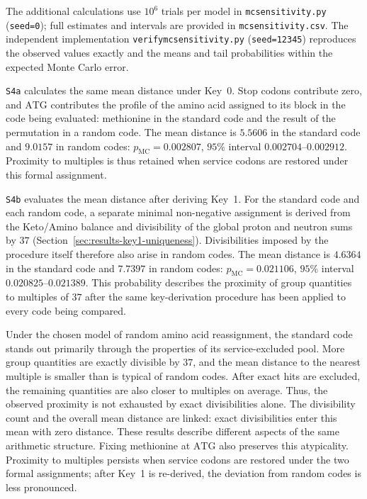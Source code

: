\documentclass[11pt,a4paper]{article}
\renewcommand{\_}{\origunderscore\allowbreak}
\begin{document}
The additional calculations use $10^{6}$ trials per model
in \texttt{mc\_sensitivity.py} (\texttt{seed=0}); full estimates
and intervals are provided in \texttt{mc\_sensitivity.csv}.
The independent implementation \texttt{verify\_mc\_sensitivity.py}
(\texttt{seed=12345}) reproduces the observed values exactly
and the means and tail probabilities within the expected
Monte Carlo error.

\texttt{S4a} calculates the same mean distance under Key~0.
Stop codons contribute zero, and $\mathrm{ATG}$ contributes
the profile of the amino acid assigned to its block in the
code being evaluated: methionine in the standard code and
the result of the permutation in a random code.
The mean distance is $5.5606$ in the standard code and $9.0157$
in random codes:
$p_{\mathrm{MC}} = 0.002807$,
$95\%$ interval $0.002704$--$0.002912$.
Proximity to multiples is thus retained when service codons
are restored under this formal assignment.

\texttt{S4b} evaluates the mean distance after deriving Key~1.
For the standard code and each random code, a separate minimal
non-negative assignment is derived from the Keto/Amino balance
and divisibility of the global proton and neutron sums by $37$
(Section~\ref{sec:results-key1-uniqueness}).
Divisibilities imposed by the procedure itself therefore also
arise in random codes. The mean distance is $4.6364$ in the
standard code and $7.7397$ in random codes:
$p_{\mathrm{MC}} = 0.021106$,
$95\%$ interval $0.020825$--$0.021389$.
This probability describes the proximity of group quantities
to multiples of $37$ after the same key-derivation procedure
has been applied to every code being compared.

Under the chosen model of random amino acid reassignment,
the standard code stands out primarily through the properties
of its service-excluded pool. More group quantities are exactly
divisible by $37$, and the mean distance to the nearest multiple
is smaller than is typical of random codes. After exact hits
are excluded, the remaining quantities are also closer to multiples
on average. Thus, the observed proximity is not exhausted by exact
divisibilities alone. The divisibility count and the overall mean
distance are linked: exact divisibilities enter this mean with
zero distance. These results describe different aspects of the
same arithmetic structure. Fixing methionine at $\mathrm{ATG}$
also preserves this atypicality. Proximity to multiples persists when
service codons are restored under the two formal assignments;
after Key~1 is re-derived, the deviation from random codes
is less pronounced.
\end{document}
